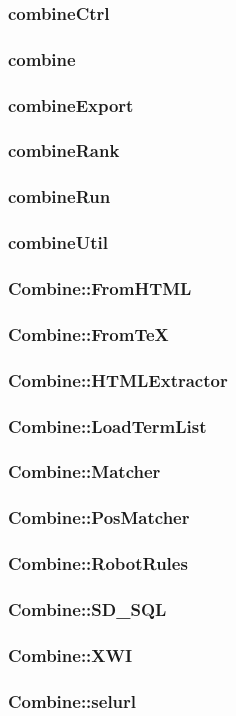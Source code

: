 \subsubsection{combineCtrl}

\subsubsection{combine}

\subsubsection{combineExport}

\subsubsection{combineRank}

\subsubsection{combineRun}

\subsubsection{combineUtil}

\subsubsection{Combine::FromHTML}

\subsubsection{Combine::FromTeX}

\subsubsection{Combine::HTMLExtractor}

\subsubsection{Combine::LoadTermList}

\subsubsection{Combine::Matcher}

\subsubsection{Combine::PosMatcher}

\subsubsection{Combine::RobotRules}

\subsubsection{Combine::SD\_SQL}

\subsubsection{Combine::XWI}

\subsubsection{Combine::selurl}

